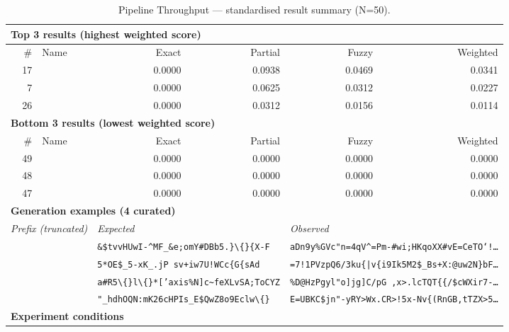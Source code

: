 \begin{table}[htbp]
\centering
\caption{Pipeline Throughput — standardised result summary (N=50).}
\label{tab:pipeline_throughput_summary}
\begin{adjustbox}{max width=\textwidth}
\begin{tabular}{r p{5cm} r r r r}
\toprule
\multicolumn{6}{l}{\textbf{Top 3 results (highest weighted score)}} \\
\midrule
\# & Name & Exact & Partial & Fuzzy & Weighted \\
\midrule
17 &  & 0.0000 & 0.0938 & 0.0469 & 0.0341 \\
7 &  & 0.0000 & 0.0625 & 0.0312 & 0.0227 \\
26 &  & 0.0000 & 0.0312 & 0.0156 & 0.0114 \\
\midrule
\multicolumn{6}{l}{\textbf{Bottom 3 results (lowest weighted score)}} \\
\midrule
\# & Name & Exact & Partial & Fuzzy & Weighted \\
\midrule
49 &  & 0.0000 & 0.0000 & 0.0000 & 0.0000 \\
48 &  & 0.0000 & 0.0000 & 0.0000 & 0.0000 \\
47 &  & 0.0000 & 0.0000 & 0.0000 & 0.0000 \\
\midrule
\multicolumn{6}{l}{\textbf{Generation examples (4 curated)}} \\
\midrule
\multicolumn{2}{l}{\textit{Prefix (truncated)}} & \multicolumn{2}{l}{\textit{Expected}} & \multicolumn{2}{l}{\textit{Observed}} \\
\midrule
\multicolumn{2}{l}{\texttt{}} & \multicolumn{2}{l}{\texttt{\&\$tvvHUwI-\^{}MF\_\&e;omY\#DBb5.\}\textbackslash\{\}\{X-F}} & \multicolumn{2}{l}{\texttt{aDn9y\%GVc"n=4qV\^{}=Pm-\#wi;HKqoXX\#vE=CeTO`!\ldots}} \\
\multicolumn{2}{l}{\texttt{}} & \multicolumn{2}{l}{\texttt{5*OE\$\_5-xK\_.jP sv+iw7U!WCc\{G\{sAd}} & \multicolumn{2}{l}{\texttt{=7!1PVzpQ6/3ku\{|v\{i9Ik5M2\$\_Bs+X:@uw2N\}bF\ldots}} \\
\multicolumn{2}{l}{\texttt{}} & \multicolumn{2}{l}{\texttt{a\#R5\textbackslash\{\}l\textbackslash\{\}*['axis\%N]c\textasciitilde{}feXLvSA;ToCYZ}} & \multicolumn{2}{l}{\texttt{\%D@HzPgyl"o]jg]C/pG ,x>.lcTQT\{\{/\$cWXir7-\ldots}} \\
\multicolumn{2}{l}{\texttt{}} & \multicolumn{2}{l}{\texttt{"\_hdhOQN:mK26cHPIs\_E\$QwZ8o9Eclw\textbackslash\{\}}} & \multicolumn{2}{l}{\texttt{E=UBKC\$jn"-yRY>Wx.CR>!5x-Nv\{(RnGB,tTZX>5\ldots}} \\
\midrule
\multicolumn{6}{l}{\textbf{Experiment conditions}} \\

\end{tabular}
\end{adjustbox}
\end{table}
